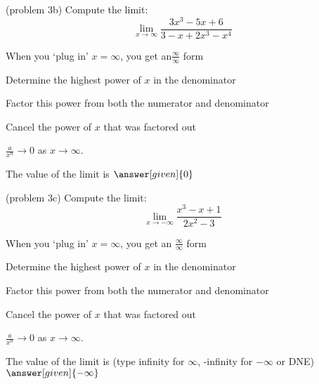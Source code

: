 \documentclass{ximera}
\begin{document}
\begin{problem}(problem 3b)
  Compute the limit:
  \[
  \lim_{x \to \infty} \frac{3x^3 - 5x + 6}{3-x+ 2x^3- x^4}
  \]
  
    \begin{hint}
      When you `plug in' $x = \infty$, you get an$\frac{\infty}{\infty}$ form
    \end{hint}
    \begin{hint}
      Determine the highest power of $x$ in the denominator
    \end{hint}
    \begin{hint}
      Factor this power from both the numerator and denominator
    \end{hint}
    \begin{hint}
      Cancel the power of $x$ that was factored out
    \end{hint}
    \begin{hint}
      $\frac{a}{x^n} \to 0$ as $x \to \infty$.
    \end{hint}
		The value of the limit is
		 $\answer[given]{0}$
		
\end{problem}


\begin{problem}(problem 3c)
  Compute the limit:
  \[
  \lim_{x \to -\infty} \frac{x^3 - x + 1}{2x^2- 3}
  \]
  
    \begin{hint}
      When you `plug in' $x = \infty$, you get an $\frac{\infty}{\infty}$ form
    \end{hint}
    \begin{hint}
      Determine the highest power of $x$ in the denominator
    \end{hint}
    \begin{hint}
      Factor this power from both the numerator and denominator
    \end{hint}
    \begin{hint}
      Cancel the power of $x$ that was factored out
    \end{hint}
    \begin{hint}
      $\frac{a}{x^n} \to 0$ as $x \to \infty$.
    \end{hint}
		The value of the limit is
		(type infinity for $\infty$, -infinity for $-\infty$ or DNE)
		 $\answer[given]{-\infty}$
		
\end{problem}
\end{document}
